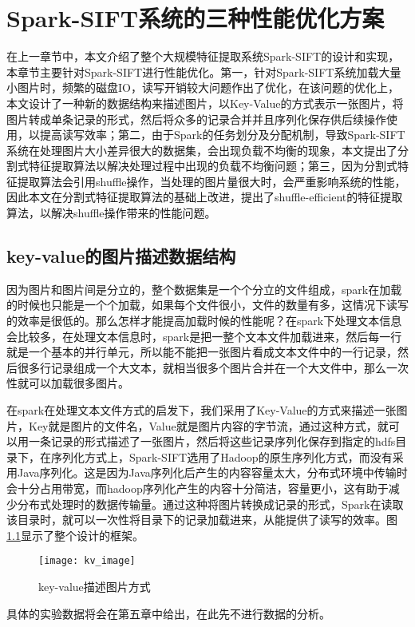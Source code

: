 ﻿\chapter{Spark-SIFT系统的三种性能优化方案}
在上一章节中，本文介绍了整个大规模特征提取系统Spark-SIFT的设计和实现，本章节主要针对Spark-SIFT进行性能优化。第一，针对Spark-SIFT系统加载大量小图片时，频繁的磁盘IO，读写开销较大问题作出了优化，在该问题的优化上，本文设计了一种新的数据结构来描述图片，以Key-Value的方式表示一张图片，将图片转成单条记录的形式，然后将众多的记录合并并且序列化保存供后续操作使用，以提高读写效率；第二，由于Spark的任务划分及分配机制，导致Spark-SIFT系统在处理图片大小差异很大的数据集，会出现负载不均衡的现象，本文提出了分割式特征提取算法以解决处理过程中出现的负载不均衡问题；第三，因为分割式特征提取算法会引用shuffle操作，当处理的图片量很大时，会严重影响系统的性能，因此本文在分割式特征提取算法的基础上改进，提出了shuffle-efficient的特征提取算法，以解决shuffle操作带来的性能问题。

\section{key-value的图片描述数据结构}
因为图片和图片间是分立的，整个数据集是一个个分立的文件组成，spark在加载的时候也只能是一个个加载，如果每个文件很小，文件的数量有多，这情况下读写的效率是很低的。那么怎样才能提高加载时候的性能呢？在spark下处理文本信息会比较多，在处理文本信息时，spark是把一整个文本文件加载进来，然后每一行就是一个基本的并行单元，所以能不能把一张图片看成文本文件中的一行记录，然后很多行记录组成一个大文本，就相当很多个图片合并在一个大文件中，那么一次性就可以加载很多图片。

在spark在处理文本文件方式的启发下，我们采用了Key-Value的方式来描述一张图片，Key就是图片的文件名，Value就是图片内容的字节流，通过这种方式，就可以用一条记录的形式描述了一张图片，然后将这些记录序列化保存到指定的hdfs目录下，在序列化方式上，Spark-SIFT选用了Hadoop的原生序列化方式，而没有采用Java序列化。这是因为Java序列化后产生的内容容量太大，分布式环境中传输时会十分占用带宽，而hadoop序列化产生的内容十分简洁，容量更小，这有助于减少分布式处理时的数据传输量。通过这种将图片转换成记录的形式，Spark在读取该目录时，就可以一次性将目录下的记录加载进来，从能提供了读写的效率。图\ref{fig:kv_image}显示了整个设计的框架。
\begin{figure}[htp]
\centering
\texttt{[image: kv\_image]}
\caption{key-value描述图片方式}
\label{fig:kv_image}
\end{figure}

具体的实验数据将会在第五章中给出，在此先不进行数据的分析。
